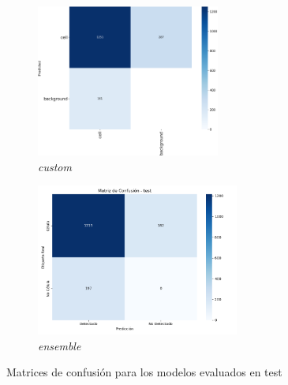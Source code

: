 \documentclass[12pt,a4paper,onecolumn,oneside]{report}
\begin{document}
\begin{figure}[H]
  \vspace{0.1cm}
  \begin{subfigure}[b]{0.45\textwidth}
    \centering
    \includegraphics[height=5cm]{figuras/resultados experimentacion/custom/test/confusion_matrix.png}
    \vspace{-0.3cm}
    \caption{\footnotesize \textit{custom}}
    \label{fig:confusion_custom_test}
  \end{subfigure}
  \hfill
  \begin{subfigure}[b]{0.45\textwidth}
    \centering
    \includegraphics[height=5cm]{figuras/resultados experimentacion/ensemble/confusion_matrices/confusion_matrix_test.png}
    \vspace{-0.3cm}
    \caption{\footnotesize \textit{ensemble}}
    \label{fig:confusion_ensemble_test}
  \end{subfigure}
  
  \vspace{-0.2cm}
  \caption{Matrices de confusión para los modelos evaluados en test}
  \label{fig:confusion_matrices_test}
\end{figure}
\end{document}
